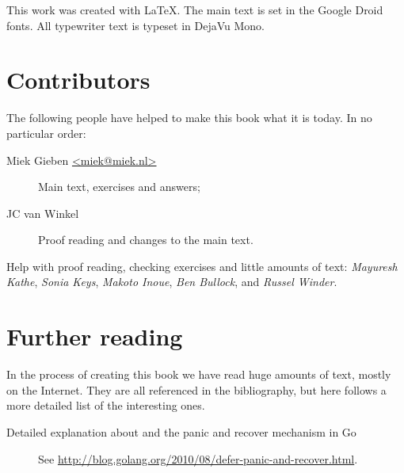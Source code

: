 \noindent{}This work was created with \LaTeX. The main text is set in
the Google Droid fonts. All typewriter text is typeset in DejaVu Mono.

\section{Contributors}
The following people have helped to make this book what it is today.
In no particular order:
\begin{description}
\item[Miek Gieben \qquad\url{<miek@miek.nl>}] 
{Main text, exercises and answers;}
\item[JC van Winkel]
{Proof reading and changes to the main text.}
\end{description}

Help with proof reading, checking exercises and little amounts of text:
\emph{Mayuresh Kathe},
\emph{Sonia Keys},
\emph{Makoto Inoue},
\emph{Ben Bullock},
and \emph{Russel Winder}.

\section{Further reading}
In the process of creating this book we have read huge amounts of text,
mostly on the Internet. They are all referenced in the bibliography, but
here follows a more detailed list of the interesting ones.
\begin{description}
\item[Detailed explanation about  and the panic and recover
mechanism in Go]{See 
\url{http://blog.golang.org/2010/08/defer-panic-and-recover.html}.}
\end{description}
